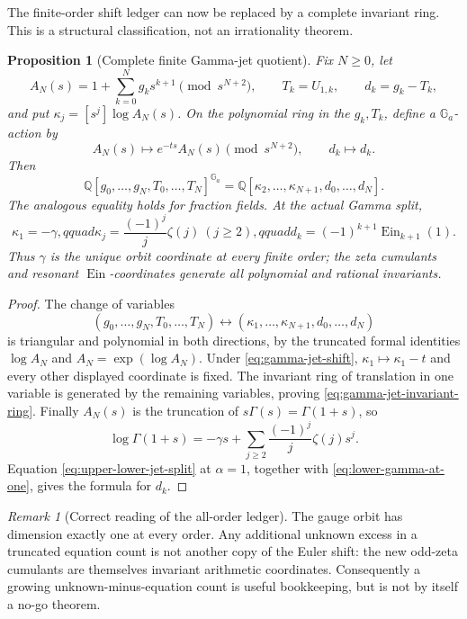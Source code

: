 \documentclass[11pt]{article}
\theoremstyle{keio}
\newtheorem{proposition}[theorem]{Proposition}
\theoremstyle{definition}
\theoremstyle{remark}
\newtheorem{remark}[theorem]{Remark}
\newcommand{\Q}{\mathbb Q}
\newcommand{\Ein}{\operatorname{Ein}}
\begin{document}
The finite-order shift ledger can now be replaced by a complete invariant
ring.  This is a structural classification, not an irrationality theorem.

\begin{proposition}[Complete finite Gamma-jet quotient]
\label{prop:finite-gamma-jet-quotient}
Fix \(N\ge0\), let
\[
 A_N(s)=1+\sum_{k=0}^Ng_ks^{k+1}\pmod {s^{N+2}},
 \qquad T_k=U_{1,k},\qquad d_k=g_k-T_k,
\]
and put \(\kappa_j=[s^j]\log A_N(s)\).  On the polynomial ring in the
\(g_k,T_k\), define a \(\mathbb G_a\)-action by
\begin{equation}\label{eq:gamma-jet-shift}
 A_N(s)\longmapsto e^{-ts}A_N(s)\pmod {s^{N+2}},
 \qquad d_k\longmapsto d_k.
\end{equation}
Then
\begin{equation}\label{eq:gamma-jet-invariant-ring}
 \boxed{\displaystyle
 \Q[g_0,\ldots,g_N,T_0,\ldots,T_N]^{\mathbb G_a}
 =\Q[\kappa_2,\ldots,\kappa_{N+1},d_0,\ldots,d_N].}
\end{equation}
The analogous equality holds for fraction fields.  At the actual Gamma
split,
\begin{equation}\label{eq:actual-gamma-jet-invariants}
 \kappa_1=-\gamma,qquad
 \kappa_j=\frac{(-1)^j}{j}\zeta(j)\ (j\ge2),qquad
 d_k=(-1)^{k+1}\Ein_{k+1}(1).
\end{equation}
Thus \(\gamma\) is the unique orbit coordinate at every finite order; the
zeta cumulants and resonant \(\Ein\)-coordinates generate all polynomial
and rational invariants.
\end{proposition}

\begin{proof}
The change of variables
\[
 (g_0,\ldots,g_N,T_0,\ldots,T_N)
 \longleftrightarrow
 (\kappa_1,\ldots,\kappa_{N+1},d_0,\ldots,d_N)
\]
is triangular and polynomial in both directions, by the truncated formal
identities \(\log A_N\) and \(A_N=\exp(\log A_N)\).  Under
\eqref{eq:gamma-jet-shift}, \(\kappa_1\mapsto\kappa_1-t\) and every other
displayed coordinate is fixed.  The invariant ring of translation in one
variable is generated by the remaining variables, proving
\eqref{eq:gamma-jet-invariant-ring}.  Finally
\(A_N(s)\) is the truncation of
\(s\Gamma(s)=\Gamma(1+s)\), so
\[
 \log\Gamma(1+s)=-\gamma s+
 \sum_{j\ge2}\frac{(-1)^j}{j}\zeta(j)s^j.
\]
Equation \eqref{eq:upper-lower-jet-split} at \(\alpha=1\), together with
\eqref{eq:lower-gamma-at-one}, gives the formula for \(d_k\).
\end{proof}

\begin{remark}[Correct reading of the all-order ledger]
The gauge orbit has dimension exactly one at every order.  Any additional
unknown excess in a truncated equation count is not another copy of the
Euler shift: the new odd-zeta cumulants are themselves invariant arithmetic
coordinates.  Consequently a growing unknown-minus-equation count is useful
bookkeeping, but is not by itself a no-go theorem.
\end{remark}
\end{document}
